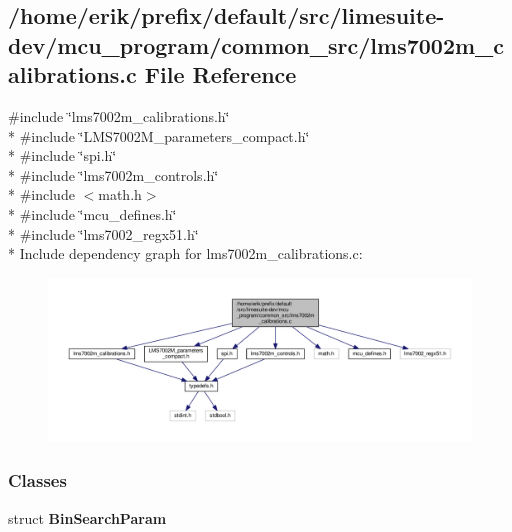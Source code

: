 \subsection{/home/erik/prefix/default/src/limesuite-\/dev/mcu\+\_\+program/common\+\_\+src/lms7002m\+\_\+calibrations.c File Reference}
\label{lms7002m__calibrations_8c}
{\ttfamily \#include \char`\"{}lms7002m\+\_\+calibrations.\+h\char`\"{}}\\*
{\ttfamily \#include \char`\"{}L\+M\+S7002\+M\+\_\+parameters\+\_\+compact.\+h\char`\"{}}\\*
{\ttfamily \#include \char`\"{}spi.\+h\char`\"{}}\\*
{\ttfamily \#include \char`\"{}lms7002m\+\_\+controls.\+h\char`\"{}}\\*
{\ttfamily \#include $<$math.\+h$>$}\\*
{\ttfamily \#include \char`\"{}mcu\+\_\+defines.\+h\char`\"{}}\\*
{\ttfamily \#include \char`\"{}lms7002\+\_\+regx51.\+h\char`\"{}}\\*
Include dependency graph for lms7002m\+\_\+calibrations.\+c\+:
\nopagebreak
\begin{figure}[H]
\begin{center}
\leavevmode
\includegraphics[width=350pt]{dc/d59/lms7002m__calibrations_8c__incl}
\end{center}
\end{figure}
\subsubsection*{Classes}
\begin{DoxyCompactItemize}
\item 
struct {\bf Bin\+Search\+Param}
\end{DoxyCompactItemize}
